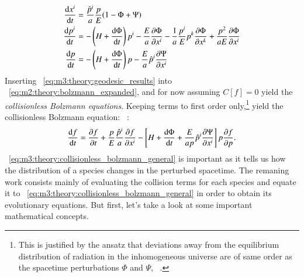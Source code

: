     \begin{subequations}\label{eq:m3:theory:geodesic_results}
        \begin{align}
            \dv{x^i}{t} &= \frac{\hat{p}^i}{a}\frac{p}{E}(1-\Phi+\Psi) \label{eq:m3:theory:metric_perturb_dxidt}\\
            \dv{p^i}{t} &= -\left(H+\dv{\Phi}{t}\right)p^i-\frac{E}{a}\pdv{\Phi}{x^i}-\frac{1}{a}\frac{p^i}{E}p^k\pdv{\Phi}{x^k} + \frac{p^2}{aE}\pdv{\Phi}{x^i} \label{eq:m3:theory:metric_perturb_dpidt}\\
            \dv{p}{t} &= -\left(H+\dv{\Phi}{t}\right)p-\frac{E}{a}\hat{p}^i\pdv{\Psi}{x^i} \label{eq:m3:theory:metric_perturb_dpdt}
        \end{align}
    \end{subequations}
    Inserting ~\cref{eq:m3:theory:geodesic_results} into ~\cref{eq:m2:theory:bolzmann_expanded}, and for now assuming $C[f]=0$ yield the \textit{collisionless Bolzmann equations}. Keeping terms to first order only,\footnote{This is justified by the ansatz that deviations away from the equilibrium distribution of radiation in the inhomogeneous universe are of same order as the spacetime perturbations $\Phi$ and $\Psi$, ~\cite{dodelson2020modern}.} yield the collisionless Bolzmann equation: ~\cite[Eq. 3.83]{dodelson2020modern}:
    \begin{equation}\label{eq:m3:theory:collisionless_bolzmann_general}
        \dv{f}{t} = \pdv{f}{t}+\frac{p}{E}\frac{\hat{p}^i}{a}\pdv{f}{x^i}-\left[H+\dv{\Phi}{t} + \frac{E}{ap}\hat{p}^i\pdv{\Psi}{x^i}\right]p\pdv{f}{p}.
    \end{equation}
    ~\cref{eq:m3:theory:collisionless_bolzmann_general} is important as it tells us how the distribution of a species changes in the perturbed spacetime. The remaning work consists mainly of evaluating the collision terms for each species and equate it to ~\cref{eq:m3:theory:collisionless_bolzmann_general} in order to obtain its evolutionary equations. But first, let's take a look at some important mathematical concepts. 

